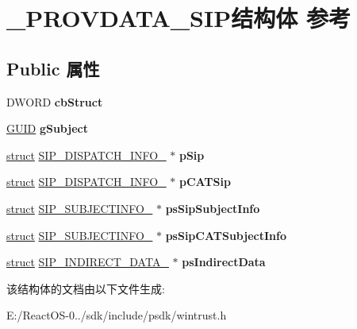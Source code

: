 \hypertarget{struct___p_r_o_v_d_a_t_a___s_i_p}{}\section{\+\_\+\+P\+R\+O\+V\+D\+A\+T\+A\+\_\+\+S\+I\+P结构体 参考}
\label{struct___p_r_o_v_d_a_t_a___s_i_p}
\subsection*{Public 属性}
\begin{DoxyCompactItemize}
\item 
\mbox{\label{struct___p_r_o_v_d_a_t_a___s_i_p_ac97973c49c483a274f260f3cc0919087}} 
D\+W\+O\+RD {\bfseries cb\+Struct}
\item 
\mbox{\label{struct___p_r_o_v_d_a_t_a___s_i_p_abe963796f93fbc7dde729d1431ea9f43}} 
\hyperlink{interface_g_u_i_d}{G\+U\+ID} {\bfseries g\+Subject}
\item 
\mbox{\label{struct___p_r_o_v_d_a_t_a___s_i_p_ac35fa7ffa58f46b5cfd49ab39d71c680}} 
\hyperlink{interfacestruct}{struct} \hyperlink{struct_s_i_p___d_i_s_p_a_t_c_h___i_n_f_o__}{S\+I\+P\+\_\+\+D\+I\+S\+P\+A\+T\+C\+H\+\_\+\+I\+N\+F\+O\+\_\+} $\ast$ {\bfseries p\+Sip}
\item 
\mbox{\label{struct___p_r_o_v_d_a_t_a___s_i_p_a81206a9a5d882fccd5149a0c5ab41732}} 
\hyperlink{interfacestruct}{struct} \hyperlink{struct_s_i_p___d_i_s_p_a_t_c_h___i_n_f_o__}{S\+I\+P\+\_\+\+D\+I\+S\+P\+A\+T\+C\+H\+\_\+\+I\+N\+F\+O\+\_\+} $\ast$ {\bfseries p\+C\+A\+T\+Sip}
\item 
\mbox{\label{struct___p_r_o_v_d_a_t_a___s_i_p_a2d0b6ae1c9d15f56faebd797c9984562}} 
\hyperlink{interfacestruct}{struct} \hyperlink{struct_s_i_p___s_u_b_j_e_c_t_i_n_f_o__}{S\+I\+P\+\_\+\+S\+U\+B\+J\+E\+C\+T\+I\+N\+F\+O\+\_\+} $\ast$ {\bfseries ps\+Sip\+Subject\+Info}
\item 
\mbox{\label{struct___p_r_o_v_d_a_t_a___s_i_p_a54ad803985d8353e7fa45bd758a8f68a}} 
\hyperlink{interfacestruct}{struct} \hyperlink{struct_s_i_p___s_u_b_j_e_c_t_i_n_f_o__}{S\+I\+P\+\_\+\+S\+U\+B\+J\+E\+C\+T\+I\+N\+F\+O\+\_\+} $\ast$ {\bfseries ps\+Sip\+C\+A\+T\+Subject\+Info}
\item 
\mbox{\label{struct___p_r_o_v_d_a_t_a___s_i_p_ae38a85eed83d398bbfb9e9dd5aba41d5}} 
\hyperlink{interfacestruct}{struct} \hyperlink{struct_s_i_p___i_n_d_i_r_e_c_t___d_a_t_a__}{S\+I\+P\+\_\+\+I\+N\+D\+I\+R\+E\+C\+T\+\_\+\+D\+A\+T\+A\+\_\+} $\ast$ {\bfseries ps\+Indirect\+Data}
\end{DoxyCompactItemize}


该结构体的文档由以下文件生成\+:\begin{DoxyCompactItemize}
\item 
E\+:/\+React\+O\+S-\/0../sdk/include/psdk/wintrust.\+h\end{DoxyCompactItemize}
